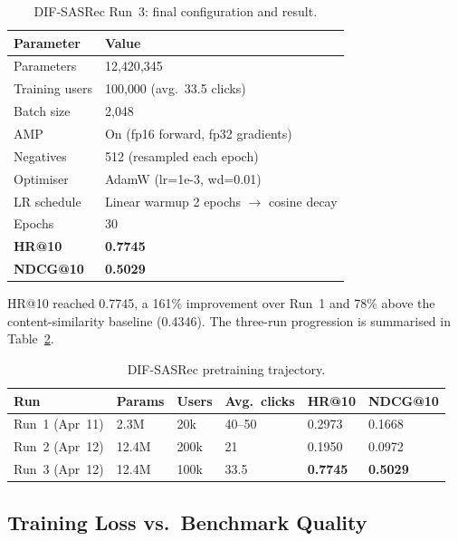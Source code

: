 \begin{table}[H]
\centering
\caption{DIF-SASRec Run~3: final configuration and result.}
\label{tab:train_run3}
\begin{tabular}{ll}
\hline
\textbf{Parameter}       & \textbf{Value} \\
\hline
Parameters               & 12{,}420{,}345 \\
Training users           & 100{,}000 (avg.\ 33.5 clicks) \\
Batch size               & 2{,}048 \\
AMP                      & On (fp16 forward, fp32 gradients) \\
Negatives                & 512 (resampled each epoch) \\
Optimiser                & AdamW (lr=1e-3, wd=0.01) \\
LR schedule              & Linear warmup 2 epochs $\to$ cosine decay \\
Epochs                   & 30 \\
\hline
\textbf{HR@10}           & \textbf{0.7745} \\
\textbf{NDCG@10}         & \textbf{0.5029} \\
\hline
\end{tabular}
\end{table}

HR@10 reached 0.7745, a 161\% improvement over Run~1 and 78\% above the content-similarity baseline (0.4346).
The three-run progression is summarised in Table~\ref{tab:train_summary}.

\begin{table}[H]
\centering
\caption{DIF-SASRec pretraining trajectory.}
\label{tab:train_summary}
\begin{tabular}{p{2.8cm} p{1.8cm} p{1.6cm} p{2.4cm} p{1.6cm} p{1.8cm}}
\hline
\textbf{Run} & \textbf{Params} & \textbf{Users} & \textbf{Avg.\ clicks} & \textbf{HR@10} & \textbf{NDCG@10} \\
\hline
Run~1 (Apr~11) & 2.3M  & 20k  & 40--50 & 0.2973 & 0.1668 \\
Run~2 (Apr~12) & 12.4M & 200k & 21     & 0.1950 & 0.0972 \\
Run~3 (Apr~12) & 12.4M & 100k & 33.5   & \textbf{0.7745} & \textbf{0.5029} \\
\hline
\end{tabular}
\end{table}

\subsection{Training Loss vs.\ Benchmark Quality}

